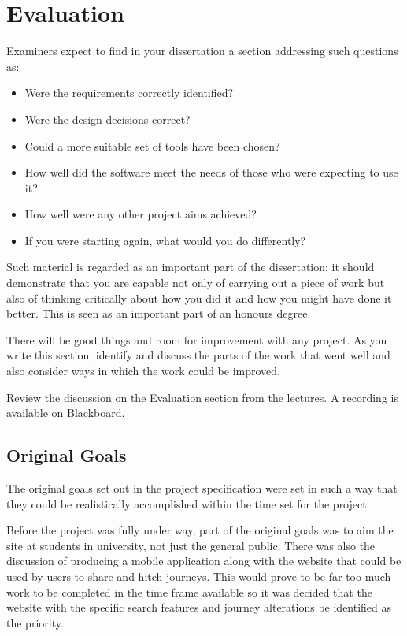 \chapter{Evaluation}

Examiners expect to find in your dissertation a section addressing such questions as:

\begin{itemize}
   \item Were the requirements correctly identified? 
   \item Were the design decisions correct?
   \item Could a more suitable set of tools have been chosen?
   \item How well did the software meet the needs of those who were expecting to use it?
   \item How well were any other project aims achieved?
   \item If you were starting again, what would you do differently?
\end{itemize}

Such material is regarded as an important part of the dissertation; it should demonstrate that you are capable not only of carrying out a piece of work but also of thinking critically about how you did it and how you might have done it better. This is seen as an important part of an honours degree. 

There will be good things and room for improvement with any project. As you write this section, identify and discuss the parts of the work that went well and also consider ways in which the work could be improved. 

Review the discussion on the Evaluation section from the lectures. A recording is available on Blackboard. 

\section{Original Goals}
The original goals set out in the project specification were set in such a way that they could be realistically accomplished within the time set for the project. 

Before the project was fully under way, part of the original goals was to aim the site at students in university, not just the general public. There was also the discussion of producing a mobile application along with the website that could be used by users to share and hitch journeys. This would prove to be far too much work to be completed in the time frame available so it was decided that the website with the specific search features and journey alterations be identified as the priority.

